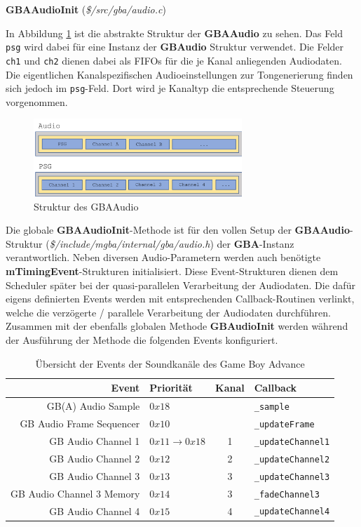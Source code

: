 \documentclass[11pt,a4paper]{scrartcl}
\newcommand{\paratitlecode}[2] {
    \vspace{5mm}
    \large \textbf{#1} \normalsize(\textit{\${#2}})
    \vspace{2mm}\newline
}
\begin{document}
\newpage
\paratitlecode{GBAAudioInit}{/src/gba/audio.c}
In Abbildung \ref{fig:gbaaudio} ist die abstrakte Struktur der \textbf{GBAAudio} zu sehen. Das Feld \verb|psg| wird dabei f\"ur eine Instanz der \textbf{GBAudio} Struktur verwendet. Die Felder \verb|ch1| und \verb|ch2| dienen dabei als FIFOs f\"ur die je Kanal anliegenden Audiodaten. Die eigentlichen Kanalspezifischen Audioeinstellungen zur Tongenerierung finden sich jedoch im \verb|psg|-Feld. Dort wird je Kanaltyp die entsprechende Steuerung vorgenommen.

\begin{figure}[h]
    \centering
    \includegraphics[width=0.7\textwidth]{Emulator_Audio}
    \caption{Struktur des GBAAudio}
    \label{fig:gbaaudio}
\end{figure}

Die globale \textbf{GBAAudioInit}-Methode ist f\"ur den vollen Setup der \textbf{GBAAudio}-Struktur (\textit{\$/include/mgba/internal/gba/audio.h}) der \textbf{GBA}-Instanz verantwortlich. Neben diversen Audio-Parametern werden auch ben\"otigte \textbf{mTimingEvent}-Strukturen initialisiert. Diese Event-Strukturen dienen dem Scheduler sp\"ater bei der quasi-parallelen Verarbeitung der Audiodaten. Die daf\"ur eigens definierten Events werden mit entsprechenden Callback-Routinen verlinkt, welche die verz\"ogerte / parallele Verarbeitung der Audiodaten durchf\"uhren. Zusammen mit der ebenfalls globalen Methode \textbf{GBAudioInit} werden w\"ahrend der Ausf\"uhrung der Methode die folgenden Events konfiguriert.

\begin{table}[h]
    \centering
    \begin{tabular}{ r | p{3cm} | c | p{7cm} }
        \textbf{Event} & \textbf{Priorit\"at} & \textbf{Kanal} & \textbf{Callback} \\
        \hline
        GB(A) Audio Sample & $0x18$ & & \verb|_sample| \\
        \hline
        GB  Audio Frame Sequencer & $0x10$ & & \verb|_updateFrame| \\
        \hline
        GB Audio Channel 1 & $0x11 \rightarrow 0x18$ & 1 & \verb|_updateChannel1|  \\
        \hline
        GB Audio Channel 2 & $0x12$ & 2 & \verb|_updateChannel2| \\
        \hline
        GB Audio Channel 3 & $0x13$ & 3 & \verb|_updateChannel3| \\
        \hline
        GB Audio Channel 3 Memory & $0x14$ & 3 & \verb|_fadeChannel3| \\
        \hline
        GB Audio Channel 4 & $0x15$ & 4 & \verb|_updateChannel4| \\
    \end{tabular}
    \caption{\"Ubersicht der Events der Soundkan\"ale des Game Boy Advance}
    \label{table:SoundEvents}
\end{table}
\end{document}
